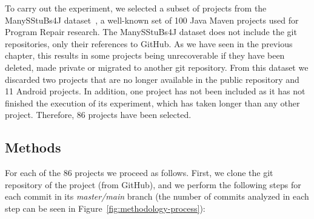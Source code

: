 
To carry out the experiment, we selected a subset of projects from the ManySStuBs4J dataset~\cite{karampatsis2020often}, a well-known set of 100 Java Maven projects used for Program Repair research.
The ManySStuBs4J dataset does not include the git repositories, only their references to GitHub. 
As we have seen in the previous chapter, this results in some projects being unrecoverable if they have been deleted, made private or migrated to another git repository.
From this dataset we discarded two projects that are no longer available in the public repository and 11 Android projects. 
In addition, one project has not been included as it has not finished the execution of its experiment, which has taken longer than any other project.
Therefore, 86 projects have been selected.

\subsection{Methods}
\label{subsec:methods}

For each of the 86 projects we proceed as follows. First, we clone the git repository of the project (from GitHub), and we perform the following steps for each commit in its \textit{master/main} branch (the number of commits analyzed in each step can be seen in Figure~\ref{fig:methodology-process}):

